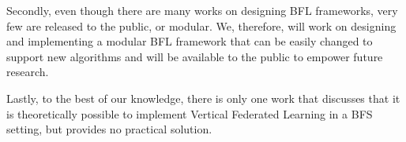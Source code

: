 Secondly, even though there are many works on designing BFL frameworks, very few are released to the public, or modular. We, therefore, will work on designing and implementing a modular BFL framework that can be easily changed to support new algorithms and will be available to the public to empower future research.

Lastly, to the best of our knowledge, there is only one work \cite{10.48550/arxiv.1912.04859} that discusses that it is theoretically possible to implement Vertical Federated Learning in a BFS setting, but provides no practical solution. 




